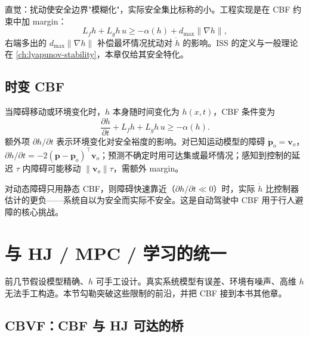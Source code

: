 直觉：扰动使安全边界"模糊化"，实际安全集比标称的小。工程实现是在 CBF 约束中加 margin：
\begin{equation}
L_fh+L_gh\,u\ge-\alpha(h)+d_{\max}\|\nabla h\|,
\label{eq:issf-margin}
\end{equation}
右端多出的 $d_{\max}\|\nabla h\|$ 补偿最坏情况扰动对 $\dot h$ 的影响。ISS 的定义与一般理论在 \cref{ch:lyapunov-stability}，本章仅给其安全特化。

\subsection{时变 CBF}

当障碍移动或环境变化时，$h$ 本身随时间变化为 $h(x,t)$，CBF 条件变为
\begin{equation}
\frac{\partial h}{\partial t}+L_fh+L_gh\,u\ge-\alpha(h).
\label{eq:time-varying-cbf}
\end{equation}
额外项 $\partial h/\partial t$ 表示环境变化对安全裕度的影响。对已知运动模型的障碍 $\dot{\mathbf p}_o=\mathbf v_o$，$\partial h/\partial t=-2(\mathbf p-\mathbf p_o)^\top\mathbf v_o$；预测不确定时用可达集或最坏情况；感知到控制的延迟 $\tau$ 内障碍可能移动 $\|\mathbf v_o\|\tau$，需额外 margin。

\begin{insight}
对动态障碍只用静态 CBF，则障碍快速靠近（$\partial h/\partial t\ll0$）时，实际 $\dot h$ 比控制器估计的更负——系统自以为安全而实际不安全。这是自动驾驶中 CBF 用于行人避障的核心挑战。
\end{insight}

\section{与 HJ / MPC / 学习的统一}
\label{sec:cbf-unify}

前几节假设模型精确、$h$ 可手工设计。真实系统模型有误差、环境有噪声、高维 $h$ 无法手工构造。本节勾勒突破这些限制的前沿，并把 CBF 接到本书其他章。

\subsection{CBVF：CBF 与 HJ 可达的桥}

